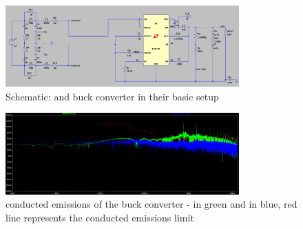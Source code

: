 \begin{figure}[htbp]
    \centering
    \includegraphics[width=0.8\textwidth]{img/schematic_no_nothing.png}
    \caption{Schematic:  and buck converter in their basic setup}
    \label{fig:no_nothing_schematic}
\end{figure}

\begin{figure}[htbp]
    \centering
    \includegraphics[width=0.8\textwidth]{img/emc_no_nothing.png}
    \caption{conducted emissions of the buck converter -  in green and  in blue, red line represents the conducted emissions limit}
    \label{fig:no_nothing_emc}
\end{figure}



